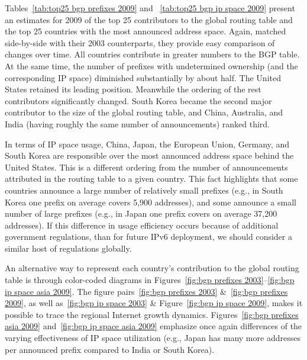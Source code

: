 Tables~\ref{tab:top25 bgp prefixes 2009} and ~\ref{tab:top25 bgp ip space 2009}
present an estimates for 2009 of the top 25 contributors to the global routing
table and the top 25 countries with the most announced address space. Again,
matched side-by-side with their 2003 counterparts, they provide easy comparison
of changes over time.  All countries contribute in greater numbers to the BGP
table. At the same time, the number of prefixes with undetermined ownership
(and the corresponding IP space) diminished substantially by about half. The
United States retained its leading position. Meanwhile the ordering of the rest
contributors significantly changed. South Korea became the second major
contributor to the size of the global routing table, and China, Australia, and
India (having roughly the same number of announcements) ranked third.

In terms of IP space usage, China, Japan, the European Union, Germany, and
South Korea are responsible over the most announced address space behind the
United States. This is a different ordering from the number of announcements
attributed in the routing table to a given country.  This fact highlights that
some countries announce a large number of relatively small prefixes (e.g., in
South Korea one prefix on average covers 5,900 addresses), and some announce a
small number of large prefixes (e.g., in Japan one prefix covers on average
37,200 addresses). If this difference in usage efficiency occurs because of
additional government regulations, than for future IPv6 deployment, we should
consider a similar host of regulations globally.


An alternative way to represent each country's contribution to the global
routing table is through color-coded diagrams in Figures~\ref{fig:bgp prefixes
2003}--\ref{fig:bgp ip space asia 2009}. The figure pairs~\ref{fig:bgp prefixes
2003} \&~\ref{fig:bgp prefixes 2009}, as well as~\ref{fig:bgp ip space 2003} \&
Figure~\ref{fig:bgp ip space 2009}, makes it possible to trace the regional
Internet growth dynamics. Figures~\ref{fig:bgp prefixes asia 2009}
and~\ref{fig:bgp ip space asia 2009} emphasize once again differences of the
varying effectiveness of IP space utilization (e.g., Japan has many more
addresses per announced prefix compared to India or South Korea).



